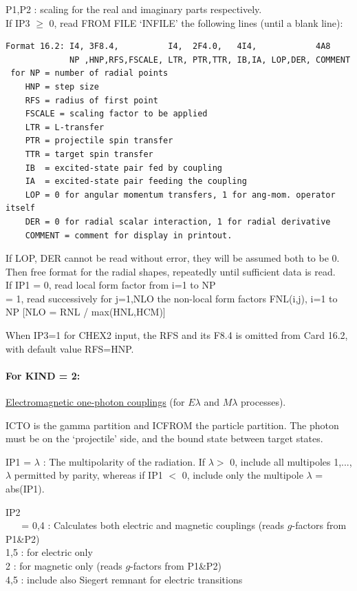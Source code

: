 \documentclass[11pt]{article}
\begin{document}
\begin{description}
 P1,P2 : scaling for the real and imaginary parts respectively.\\

   If IP3 $\geq$  0, read FROM FILE `INFILE'  the following lines
   (until a blank line):
\begin{verbatim}
Format 16.2: I4, 3F8.4,          I4,  2F4.0,   4I4,            4A8
             NP ,HNP,RFS,FSCALE, LTR, PTR,TTR, IB,IA, LOP,DER, COMMENT
 for NP = number of radial points
    HNP = step size
    RFS = radius of first point
    FSCALE = scaling factor to be applied
    LTR = L-transfer
    PTR = projectile spin transfer
    TTR = target spin transfer
    IB  = excited-state pair fed by coupling
    IA  = excited-state pair feeding the coupling
    LOP = 0 for angular momentum transfers, 1 for ang-mom. operator itself
    DER = 0 for radial scalar interaction, 1 for radial derivative
    COMMENT = comment for display in printout.
\end{verbatim}
If LOP, DER cannot be read without error, they will be assumed both to be 0.\\
 Then free format for the radial shapes, repeatedly until sufficient data is read.\\


 If IP1 =
      0, read local form factor from i=1 to NP
\\  =  1, read successively for j=1,NLO the non-local form factors
 FNL(i,j), i=1 to NP   [NLO = RNL / max(HNL,HCM)]


When IP3=1 for CHEX2 input, the RFS and its F8.4 is omitted from Card 16.2,
with default value RFS=HNP.


\paragraph{For KIND = 2:}
\underline{Electromagnetic one-photon couplings} (for $E\lambda$ and
$M\lambda$ processes).



 ICTO is the gamma partition and ICFROM the particle partition.
 The photon must be on the `projectile' side, and the bound state between
 target states.

 IP1 = $\lambda$ : The multipolarity of the radiation.
 If $\lambda >$ 0, include all multipoles 1,...,$\lambda$
permitted by parity, whereas if IP1 $<$ 0, include only the multipole
$\lambda$ = abs(IP1).
%

IP2\\
~ ~   = 0,4 : Calculates both electric and magnetic couplings
(reads $g$-factors from P1\&P2)
\\    1,5 : for electric only
\\    2 : for magnetic only (reads $g$-factors from P1\&P2)
\\    4,5 : include also Siegert remnant for electric transitions



\end{description}
\end{document}
